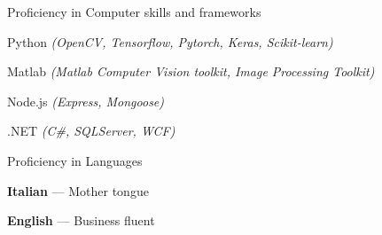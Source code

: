


\begin{cventries}

 
  \cventry
    {Proficiency in} %
    {Computer skills and frameworks} %
    {} %
    {} %
    {
      \begin{cvitems} %
	\item Python \textit{(OpenCV, Tensorflow, Pytorch, Keras, Scikit-learn)}
	\item Matlab \textit{(Matlab Computer Vision toolkit, Image Processing Toolkit)}
	\item Node.js \textit{(Express, Mongoose)}
	\item .NET \textit{(C\#, SQLServer, WCF)}
	\end{cvitems}
	}
	
  \cventry
    {Proficiency in} %
    {Languages} %
    {} %
    {} %
    {
      \begin{cvitems} %
	\item \textbf{Italian} --- {Mother tongue}
	\item \textbf{English} --- {Business fluent}
	\end{cvitems}
	}
	
	

\end{cventries}
